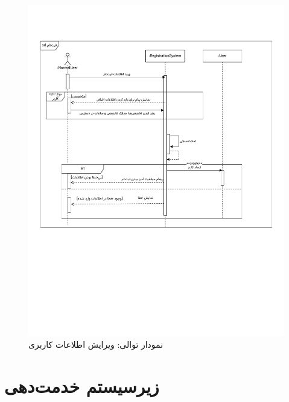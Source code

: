 \begin{figure}[ht!]
	\centering
	\includegraphics[scale=0.8, page=8]{figs/OOD-Sequence-1.pdf}
	\caption{نمودار توالی: ویرایش اطلاعات کاربری}
\end{figure}
\FloatBarrier
\newpage


\section{زیرسیستم خدمت‌دهی}


